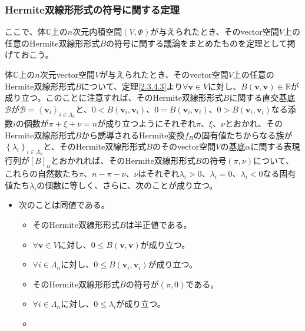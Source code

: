 \documentclass[dvipdfmx]{jsarticle}
\begin{document}
\subsubsection{Hermite双線形形式の符号に関する定理}%
ここで、体$\mathbb{C}$上の$n$次元内積空間$(V,\varPhi)$が与えられたとき、そのvector空間$V$上の任意のHermite双線形形式$B$の符号に関する議論をまとめたものを定理として掲げておこう。
\begin{thm}[Hermite双線形形式の符号に関する定理]\label{2.3.10.7}
体$\mathbb{C}$上の$n$次元vector空間$V$が与えられたとき、そのvector空間$V$上の任意のHermite双線形形式$B$について、定理\ref{2.3.4.3}より$\forall\mathbf{v} \in V$に対し、$B\left( \mathbf{v},\mathbf{v} \right) \in \mathbb{R}$が成り立つ。このことに注意すれば、そのHermite双線形形式$B$に関する直交基底$\mathcal{B}$が$\mathcal{B}=\left\langle \mathbf{v}_{i} \right\rangle_{i \in \varLambda_{n}}$と、$0 < B\left( \mathbf{v}_{i},\mathbf{v}_{i} \right)$、$0 = B\left( \mathbf{v}_{i},\mathbf{v}_{i} \right)$、$0 > B\left( \mathbf{v}_{i},\mathbf{v}_{i} \right)$なる添数$i$の個数が$\pi + \xi + \nu = n$が成り立つようにそれぞれ$\pi$、$\xi$、$\nu$とおかれ、そのHermite双線形形式$B$から誘導されるHermite変換$f_{B}$の固有値たちからなる族が$\left\{ \lambda_{i} \right\}_{i \in \varLambda_{n}}$と、そのHermite双線形形式$B$のそのvector空間$V$の基底$\alpha$に関する表現行列が$[ B]_{\alpha}$とおかれれば、そのHermite双線形形式$B$の符号$(\pi,\nu)$について、これらの自然数たち$\pi$、$n - \pi - \nu$、$\nu$はそれぞれ$\lambda_{i} > 0$、$\lambda_{i} = 0$、$\lambda_{i} < 0$なる固有値たち$\lambda_{i}$の個数に等しく、さらに、次のことが成り立つ。
\begin{itemize}
\item
  次のことは同値である。
  \begin{itemize}
  \item
    そのHermite双線形形式$B$は半正値である。
  \item
    $\forall\mathbf{v} \in V$に対し、$0 \leq B\left( \mathbf{v},\mathbf{v} \right)$が成り立つ。
  \item
    $\forall i \in \varLambda_{n}$に対し、$0 \leq B\left( \mathbf{v}_{i},\mathbf{v}_{i} \right)$が成り立つ。
  \item
    そのHermite双線形形式$B$の符号が$(\pi,0)$である。
  \item
    $\forall i \in \varLambda_{n}$に対し、$0 \leq \lambda_{i}$が成り立つ。
  \item

\end{itemize}
\end{itemize}
\end{thm}
\end{document}
